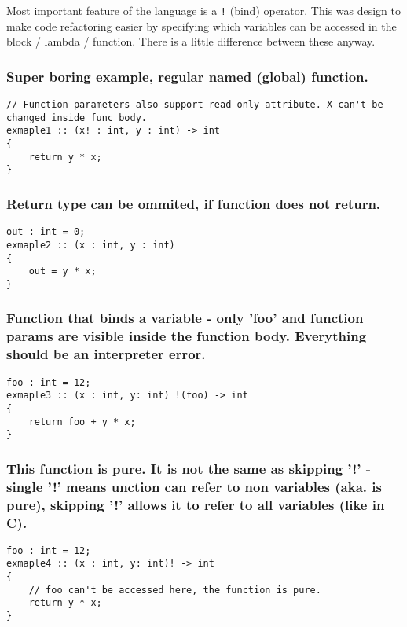 \documentclass[11pt]{article}
\begin{document}
Most important feature of the language is a \texttt{!} (bind) operator. This was design
to make code refactoring easier by specifying which variables can be accessed in
the block / lambda / function. There is a little difference between these
anyway.

\subsubsection*{Super boring example, regular named (global) function.}
\label{sec:org17c9235}
\begin{verbatim}
// Function parameters also support read-only attribute. X can't be changed inside func body.
exmaple1 :: (x! : int, y : int) -> int
{
    return y * x;
}
\end{verbatim}

\subsubsection*{Return type can be ommited, if function does not return.}
\label{sec:orgff29359}
\begin{verbatim}
out : int = 0;
exmaple2 :: (x : int, y : int)
{
    out = y * x;
}
\end{verbatim}

\subsubsection*{Function that binds a variable - only 'foo' and function params are visible inside the function body. Everything should be an interpreter error.}
\label{sec:org77a5e9e}
\begin{verbatim}
foo : int = 12;
exmaple3 :: (x : int, y: int) !(foo) -> int
{
    return foo + y * x;
}
\end{verbatim}

\subsubsection*{This function is pure. It is not the same as skipping '!' - single '!' means unction can refer to \underline{non} variables (aka. is pure), skipping '!' allows it to refer to all variables (like in C).}
\label{sec:org0057017}
\begin{verbatim}
foo : int = 12;
exmaple4 :: (x : int, y: int)! -> int
{
    // foo can't be accessed here, the function is pure.
    return y * x;
}
\end{verbatim}
\end{document}

